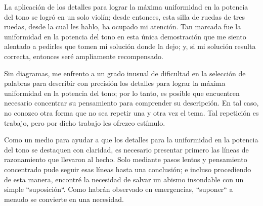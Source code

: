 \documentclass[12pt]{book}
\begin{document}
La aplicación de los detalles para lograr la máxima uniformidad en la potencia del tono se logró en un solo violín; desde entonces, esta silla de ruedas de tres ruedas, desde la cual les hablo, ha ocupado mi atención. Tan marcada fue la uniformidad en la potencia del tono en esta única demostración que me siento alentado a pedirles que tomen mi solución donde la dejo; y, si mi solución resulta correcta, entonces seré ampliamente recompensado.

Sin diagramas, me enfrento a un grado inusual de dificultad en la selección de palabras para describir con precisión los detalles para lograr la máxima uniformidad en la potencia del tono; por lo tanto, es posible que encuentren necesario concentrar su pensamiento para comprender su descripción. En tal caso, no conozco otra forma que no sea repetir una y otra vez el tema. Tal repetición es trabajo, pero por dicho trabajo les ofrezco estímulo.

Como un medio para ayudar a que los detalles para la uniformidad en la potencia del tono se destaquen con claridad, es necesario presentar primero las líneas de razonamiento que llevaron al hecho. Solo mediante pasos lentos y pensamiento concentrado pude seguir esas líneas hasta una conclusión; e incluso procediendo de esta manera, encontré la necesidad de salvar un abismo insondable con un simple ``suposición``. Como habrán observado en emergencias, ``suponer`` a menudo se convierte en una necesidad.
\end{document}
